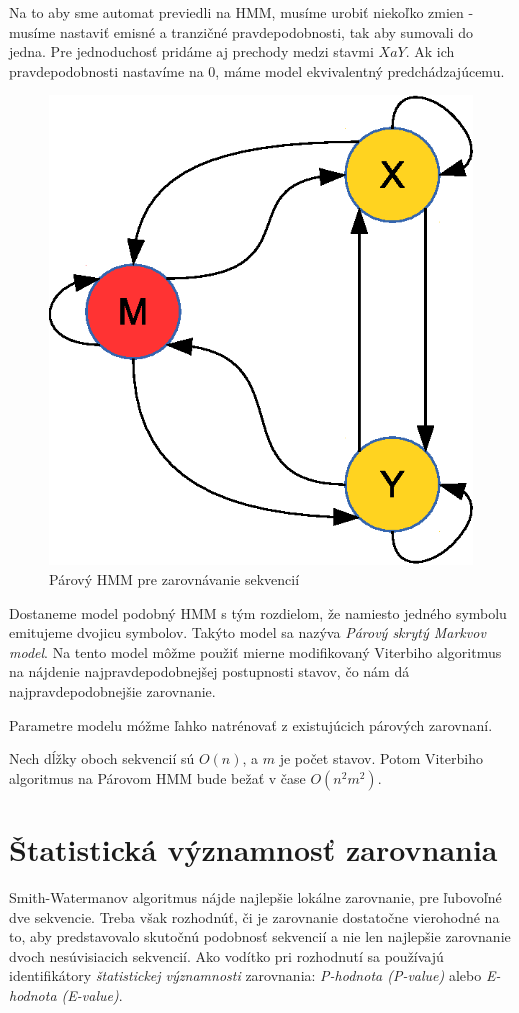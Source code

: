 Na to aby sme automat previedli na HMM, musíme urobiť niekoľko zmien - musíme nastaviť emisné a tranzičné pravdepodobnosti, tak aby sumovali do jedna. Pre jednoduchosť pridáme aj prechody medzi stavmi $X a Y$. Ak ich pravdepodobnosti nastavíme na 0, máme model ekvivalentný predchádzajúcemu.

\begin{figure}[htp]
    \centering
    \includegraphics[width=.5\textwidth]{images/simple_model}
    \caption{Párový HMM pre zarovnávanie sekvencií}
    \label{fig:simple-model}
\end{figure}

Dostaneme model podobný HMM s tým rozdielom, že namiesto jedného symbolu emitujeme dvojicu symbolov. Takýto model sa nazýva \textit{Párový skrytý Markvov model}. Na tento model môžme použiť mierne modifikovaný Viterbiho algoritmus na nájdenie najpravdepodobnejšej postupnosti stavov, čo nám dá najpravdepodobnejšie zarovnanie.

Parametre modelu móžme ľahko natrénovať z existujúcich párových zarovnaní.

Nech dĺžky oboch sekvencií sú $O(n)$, a $m$ je počet stavov. Potom Viterbiho algoritmus na Párovom HMM bude bežať v čase $O(n^2m^2)$.
\cite{durbin}

\section[Štat. významnosť ]{Štatistická významnosť zarovnania}
Smith-Watermanov algoritmus nájde najlepšie lokálne zarovnanie, pre ľubovoľné dve sekvencie. Treba však rozhodnúť, či je zarovnanie dostatočne vierohodné na to, aby predstavovalo skutočnú podobnosť sekvencií a nie len najlepšie zarovnanie dvoch nesúvisiacich sekvencií.
Ako vodítko pri rozhodnutí sa používajú identifikátory \textit{štatistickej významnosti} zarovnania: \textit{P-hodnota (P-value)} alebo \textit{E-hodnota (E-value)}.

